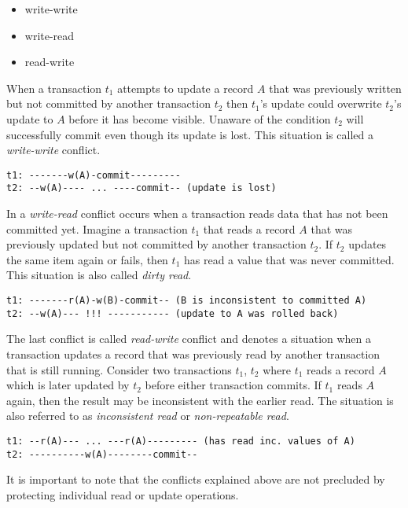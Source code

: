\begin{itemize}
    \item write-write
    \item write-read
    \item read-write
\end{itemize}

When a transaction $t_1$ attempts to update a record $A$ that was previously
written but not committed by another transaction $t_2$ then $t_1$'s update could
overwrite $t_2$'s update to $A$ before it has become visible. Unaware of the
condition $t_2$ will successfully commit even though its update is lost. This
situation is called a \emph{write-write} conflict.

\begin{lstlisting}
t1: -------w(A)-commit---------
t2: --w(A)---- ... ----commit-- (update is lost)
\end{lstlisting}

In a \emph{write-read} conflict occurs when a transaction reads data that has
not been committed yet. Imagine a transaction $t_1$ that reads a record $A$ that
was previously updated but not committed by another transaction $t_2$. If $t_2$
updates the same item again or fails, then $t_1$ has read a value that was never
committed. This situation is also called \emph{dirty read}.

\begin{lstlisting}
t1: -------r(A)-w(B)-commit-- (B is inconsistent to committed A)
t2: --w(A)--- !!! ----------- (update to A was rolled back)
\end{lstlisting}

The last conflict is called \emph{read-write} conflict and denotes a situation
when a transaction updates a record that was previously read by another
transaction that is still running. Consider two transactions $t_1$, $t_2$ where
$t_1$ reads a record $A$ which is later updated by $t_2$ before either
transaction commits. If $t_1$ reads $A$ again, then the result may be
inconsistent with the earlier read. The situation is also referred to as
\emph{inconsistent read} or \emph{non-repeatable read}.

\begin{lstlisting}
t1: --r(A)--- ... ---r(A)--------- (has read inc. values of A)
t2: ----------w(A)--------commit--
\end{lstlisting}

It is important to note that the conflicts explained above are not precluded by protecting individual read or update operations.

